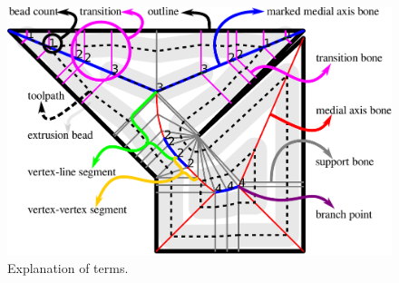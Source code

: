 \begin{figure}
\includegraphics[width=\columnwidth]{sources/method/terminology.pdf}
\caption{Explanation of terms.}
\label{legend}
\end{figure}








\iffalse

